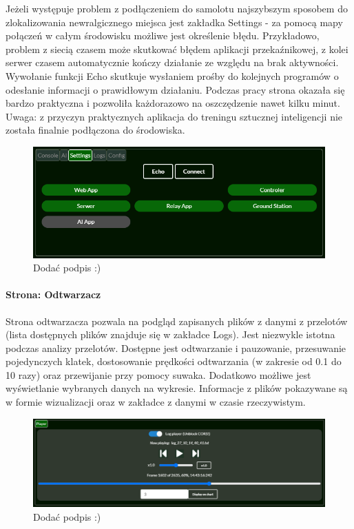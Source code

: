 \documentclass[12pt, a4paper]{article}
\begin{document}
Jeżeli występuje problem z podłączeniem do samolotu najszybszym sposobem do zlokalizowania newralgicznego miejsca jest zakładka Settings - za pomocą mapy połączeń w całym środowisku możliwe jest określenie błędu. Przykładowo, problem z siecią czasem może skutkować błędem aplikacji przekaźnikowej, z kolei serwer czasem automatycznie kończy działanie ze względu na brak aktywności.  Wywołanie funkcji Echo skutkuje wysłaniem prośby do kolejnych programów o odesłanie informacji o prawidłowym działaniu. Podczas pracy strona okazała się bardzo praktyczna i pozwoliła każdorazowo na oszczędzenie nawet kilku minut. Uwaga: z przyczyn praktycznych aplikacja do treningu sztucznej inteligencji nie została finalnie podłączona do środowiska.

 \begin{figure}[H]
    \centering
    \includegraphics[width=1\textwidth]{settings}
    \caption{Dodać podpis :)}
\end{figure}


\paragraph{Strona: Odtwarzacz}\mbox{}

Strona odtwarzacza pozwala na podgląd zapisanych plików z danymi z przelotów (lista dostępnych plików znajduje się w zakładce Logs). Jest niezwykle istotna podczas analizy przelotów. Dostępne jest odtwarzanie i pauzowanie, przesuwanie pojedynczych klatek, dostosowanie prędkości odtwarzania (w zakresie od 0.1 do 10 razy) oraz przewijanie przy pomocy suwaka. Dodatkowo możliwe jest wyświetlanie wybranych danych na wykresie. Informacje z plików pokazywane są w formie wizualizacji oraz w zakładce z danymi w czasie rzeczywistym.

 \begin{figure}[H]
    \centering
    \includegraphics[width=1\textwidth]{player}
    \caption{Dodać podpis :)}
\end{figure}
\end{document}
